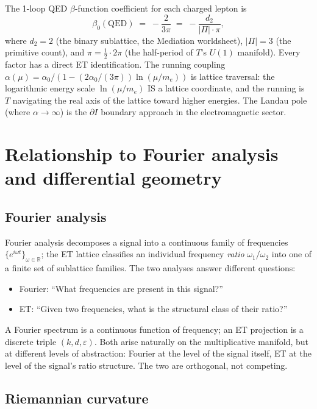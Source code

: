 \documentclass[11pt,a4paper]{article}
\theoremstyle{definition}
\theoremstyle{remark}
\newcommand{\R}{\mathbb{R}}
\newcommand{\eps}{\varepsilon}
\begin{document}
The 1-loop QED $\beta$-function coefficient for each charged lepton is
\[
\beta_{0}(\mathrm{QED}) \;=\; -\frac{2}{3\pi} \;=\; -\frac{d_{2}}{|\Pi| \cdot \pi},
\]
where $d_{2} = 2$ (the binary sublattice, the Mediation worldsheet), $|\Pi| = 3$ (the primitive count), and $\pi = \tfrac{1}{2} \cdot 2\pi$ (the half-period of $T$'s $U(1)$ manifold). Every factor has a direct ET identification. The running coupling $\alpha(\mu) = \alpha_{0}/(1 - (2\alpha_{0}/(3\pi))\ln(\mu/m_{e}))$ is lattice traversal: the logarithmic energy scale $\ln(\mu/m_{e})$ IS a lattice coordinate, and the running is $T$ navigating the real axis of the lattice toward higher energies. The Landau pole (where $\alpha \to \infty$) is the $\partial I$ boundary approach in the electromagnetic sector.

\section{Relationship to Fourier analysis and differential geometry}\label{sec:comparison}

\subsection{Fourier analysis}

Fourier analysis decomposes a signal into a continuous family of frequencies $\{e^{i\omega t}\}_{\omega\in\R}$; the ET lattice classifies an individual frequency \emph{ratio} $\omega_{1}/\omega_{2}$ into one of a finite set of sublattice families. The two analyses answer different questions:
\begin{itemize}[leftmargin=*]
\item Fourier: ``What frequencies are present in this signal?''
\item ET: ``Given two frequencies, what is the structural class of their ratio?''
\end{itemize}

A Fourier spectrum is a continuous function of frequency; an ET projection is a discrete triple $(k,d,\eps)$. Both arise naturally on the multiplicative manifold, but at different levels of abstraction: Fourier at the level of the signal itself, ET at the level of the signal's ratio structure. The two are orthogonal, not competing.

\subsection{Riemannian curvature}
\end{document}
